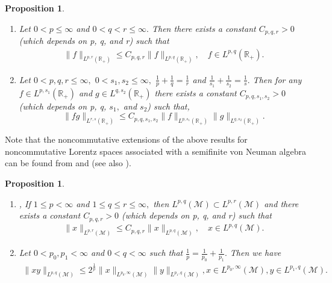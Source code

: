 \documentclass[a4paper,12pt]{amsart}
\newtheorem{prop}[thm]{Proposition}
\numberwithin{equation}{section}
\theoremstyle{definition}
\begin{document}
\begin{prop}\label{0.1}

\begin{enumerate}[\rm(i)]

   \item \cite[Proposition 1.4.10, p. 49]{G2008} Let $ 0 < p \leq \infty $ and $0 < q < r \leq\infty.$ Then there exists a constant $C_{p,q,r}>0$ (which depends on p, q, and r) such that
\begin{eqnarray}\label{Lorentz-embedding-1}
\|f\|_{L^{p,r}(\mathbb{R}_{+})}\leq C_{p,q,r}\|f\|_{L^{p,q}(\mathbb{R}_{+})}, \quad f\in L^{p,q}(\mathbb{R}_{+}).    
\end{eqnarray} 
\item \cite[Exercises 1.4.19, p. 73]{G2008} Let $0<p,q,r\leq \infty,$ $0<s_1,s_2\leq\infty,$    $\frac{1}{p}+\frac{1}{q}=\frac{1}{r}$ and $\frac{1}{s_1}+\frac{1}{s_2}=\frac{1}{s}.$ Then for any $f\in L^{p,s_1}(\mathbb{R}_{+})$ and $g\in L^{q,s_2}(\mathbb{R}_{+})$ there exists a constant $C_{p,q,s_1,s_2}>0$ (which depends on p, q, $s_1,$ and  $s_2$) such that,
\begin{equation}\label{Lorentz-embedding-2}
\|fg\|_{L^{r,s}(\mathbb{R}_{+})}\leq C_{p,q,s_1,s_2}\|f\|_{L^{p,s_1}(\mathbb{R}_{+})}\|g\|_{L^{q,s_2}(\mathbb{R}_{+})}.          \end{equation} 
\end{enumerate}
    \end{prop}
Note that the noncommutative extensions of the above results for noncommutative Lorentz spaces associated with a semifinite  von Neuman algebra can be found from \cite{DPS} and \cite{PXu} (see also  \cite{Z}).
\begin{prop}\label{prop-0.2}

\begin{enumerate}[\rm(i)]

   \item \cite[Theorem 6.7.12 (ii), p. 402]{DPS}, \cite[Lemma 2.1 (ii)]{Z} If $ 1\leq p < \infty $ and $1\leq q \leq r \leq\infty,$ then $L^{p,q}(\mathcal{M}) \subset L^{p,r}(\mathcal{M})$ and there exists a constant $C_{p,q,r}>0$ (which depends on p, q, and r) such that
\begin{eqnarray}\label{Lorentz-embedding-1-oper}
\|x\|_{L^{p,r}(\mathcal{M})}\leq C_{p,q,r}\|x\|_{L^{p,q}(\mathcal{M})},\quad x\in L^{p,q}(\mathcal{M}).     
\end{eqnarray} 
\item \cite[Lemma 2.2]{Z} Let $0<p_0,p_1<\infty$ and $0<q<\infty$ such that   $\frac{1}{p}=\frac{1}{p_0}+\frac{1}{p_1}.$ Then we have
\begin{eqnarray}\label{Lorentz-embedding-2-oper}
\|xy\|_{L^{p,q}(\mathcal{M})}\leq 2^{\frac{1}{p}}\|x\|_{L^{p_0,\infty}(\mathcal{M})}\|y\|_{L^{p_1,q}(\mathcal{M})}, x\in L^{p_0,\infty}(\mathcal{M}), y\in L^{p_1,q}(\mathcal{M}).   
\end{eqnarray} 
\end{enumerate}
    \end{prop}
\end{document}
